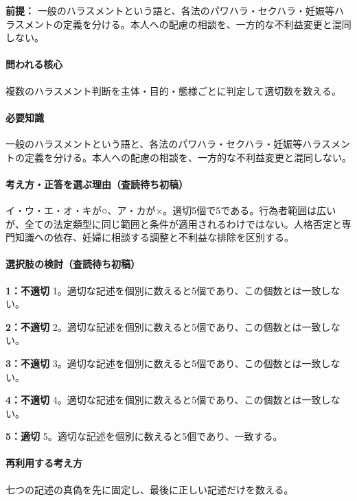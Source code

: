 \noindent\textbf{前提：} 一般のハラスメントという語と、各法のパワハラ・セクハラ・妊娠等ハラスメントの定義を分ける。本人への配慮の相談を、一方的な不利益変更と混同しない。\par

\paragraph{問われる核心} 複数のハラスメント判断を主体・目的・態様ごとに判定して適切数を数える。

\paragraph{必要知識} 一般のハラスメントという語と、各法のパワハラ・セクハラ・妊娠等ハラスメントの定義を分ける。本人への配慮の相談を、一方的な不利益変更と混同しない。

\paragraph{考え方・正答を選ぶ理由（査読待ち初稿）} イ・ウ・エ・オ・キが○、ア・カが×。適切5個で5である。行為者範囲は広いが、全ての法定類型に同じ範囲と条件が適用されるわけではない。人格否定と専門知識への依存、妊婦に相談する調整と不利益な排除を区別する。

\paragraph{選択肢の検討（査読待ち初稿）}\mbox{}\par

\noindent\textbf{1：不適切} 1。適切な記述を個別に数えると5個であり、この個数とは一致しない。\par

\noindent\textbf{2：不適切} 2。適切な記述を個別に数えると5個であり、この個数とは一致しない。\par

\noindent\textbf{3：不適切} 3。適切な記述を個別に数えると5個であり、この個数とは一致しない。\par

\noindent\textbf{4：不適切} 4。適切な記述を個別に数えると5個であり、この個数とは一致しない。\par

\noindent\textbf{5：適切} 5。適切な記述を個別に数えると5個であり、一致する。\par

\paragraph{再利用する考え方} 七つの記述の真偽を先に固定し、最後に正しい記述だけを数える。

